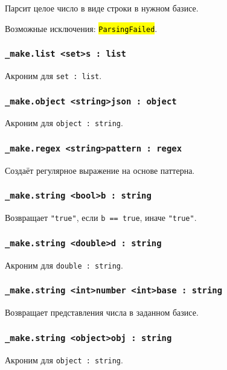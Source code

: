 \documentclass[a4paper, 14pt]{extarticle}
\newcommand{\ferror}[1]{{\fontsize{11pt}{12pt}\tt{\sethlcolor{yellow}\hl{#1}}}}
\begin{document}
Парсит целое число в виде строки в нужном базисе.

Возможные исключения: \ferror{ParsingFailed}.

\subsubsection{\lstinline|_make.list <set>s : list|}

Акроним для \lstinline|set : list|.

\subsubsection{\lstinline|_make.object <string>json : object|}

Акроним для \lstinline|object : string|.

\subsubsection{\lstinline|_make.regex <string>pattern : regex|}

Создаёт регулярное выражение на основе паттерна.

\subsubsection{\lstinline|_make.string <bool>b : string|}

Возвращает \lstinline|"true"|, если \lstinline|b == true|, иначе \lstinline|"true"|.

\subsubsection{\lstinline|_make.string <double>d : string|}

Акроним для \lstinline|double : string|.

\subsubsection{\lstinline|_make.string <int>number <int>base : string|}

Возвращает представления числа в заданном базисе.

\subsubsection{\lstinline|_make.string <object>obj : string|}

Акроним для \lstinline|object : string|.
\end{document}
